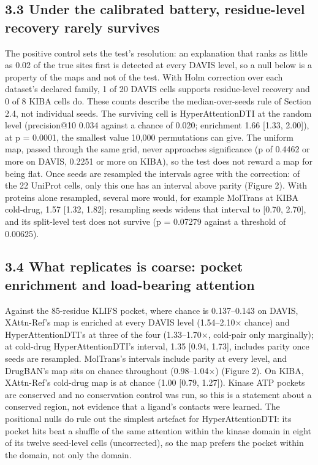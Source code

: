 \documentclass[
  11pt,
]{article}
\begin{document}
\subsection{3.3 Under the calibrated battery, residue-level recovery rarely survives}\label{under-the-calibrated-battery-residue-level-recovery-rarely-survives}

The positive control sets the test's resolution: an explanation that ranks as little as 0.02 of the true sites first is detected at every DAVIS level, so a null below is a property of the maps and not of the test. With Holm correction over each dataset's declared family, 1 of 20 DAVIS cells supports residue-level recovery and 0 of 8 KIBA cells do. These counts describe the median-over-seeds rule of Section 2.4, not individual seeds. The surviving cell is HyperAttentionDTI at the random level (precision@10 0.034 against a chance of 0.020; enrichment 1.66 {[}1.33, 2.00{]}), at p = 0.0001, the smallest value 10,000 permutations can give. The uniform map, passed through the same grid, never approaches significance (p of 0.4462 or more on DAVIS, 0.2251 or more on KIBA), so the test does not reward a map for being flat. Once seeds are resampled the intervals agree with the correction: of the 22 UniProt cells, only this one has an interval above parity (Figure 2). With proteins alone resampled, several more would, for example MolTrans at KIBA cold-drug, 1.57 {[}1.32, 1.82{]}; resampling seeds widens that interval to {[}0.70, 2.70{]}, and its split-level test does not survive (p = 0.07279 against a threshold of 0.00625).

\subsection{3.4 What replicates is coarse: pocket enrichment and load-bearing attention}\label{what-replicates-is-coarse-pocket-enrichment-and-load-bearing-attention}

Against the 85-residue KLIFS pocket, where chance is 0.137--0.143 on DAVIS, XAttn-Ref's map is enriched at every DAVIS level (1.54--2.10$\times$ chance) and HyperAttentionDTI's at three of the four (1.33--1.70$\times$, cold-pair only marginally); at cold-drug HyperAttentionDTI's interval, 1.35 {[}0.94, 1.73{]}, includes parity once seeds are resampled. MolTrans's intervals include parity at every level, and DrugBAN's map sits on chance throughout (0.98--1.04$\times$) (Figure 2). On KIBA, XAttn-Ref's cold-drug map is at chance (1.00 {[}0.79, 1.27{]}). Kinase ATP pockets are conserved and no conservation control was run, so this is a statement about a conserved region, not evidence that a ligand's contacts were learned. The positional nulls do rule out the simplest artefact for HyperAttentionDTI: its pocket hits beat a shuffle of the same attention within the kinase domain in eight of its twelve seed-level cells (uncorrected), so the map prefers the pocket within the domain, not only the domain.
\end{document}
